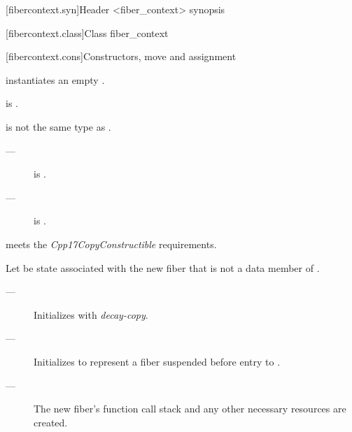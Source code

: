 [fibercontext.syn]{Header <fiber\_context> synopsis}


[fibercontext.class]{Class fiber\_context}


\newcommand{\state}{\cpp{state}}

[fibercontext.cons]{Constructors, move and assignment}
\label{constructor}

\effects
instantiates an empty \fiber.

\postcond
\emptyfn is \true.


\constraints
{} is not the same type as \fiber.

\mandates
\begin{description}
    \item[---]  is \true.
    \item[---]  is \true.
\end{description}

\precond
{} meets the \emph{Cpp17CopyConstructible} requirements.

\para Let  be state associated with the new fiber
that is not a data member of \fiber. 

\effects
\begin{description}
    \item[---] Initializes  with \emph{decay-copy}.
    \item[---] Initializes  to represent a fiber suspended before
              entry to .
    \item[---] The new fiber's function call stack and any other necessary
              resources are created.
\end{description}

